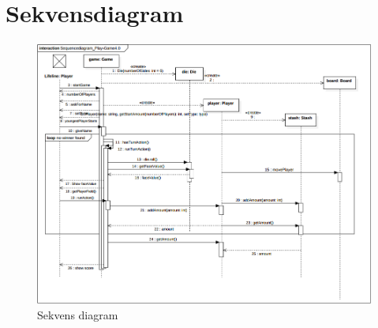 \section{Sekvensdiagram}
\begin{figure}[h]
    \begin{center}
        \includegraphics[width=\columnwidth]{graphics/domain/SQdiagram.png}
        \caption{Sekvens diagram}
        \label{fig:sekvens_diagram}
    \end{center}
\end{figure}